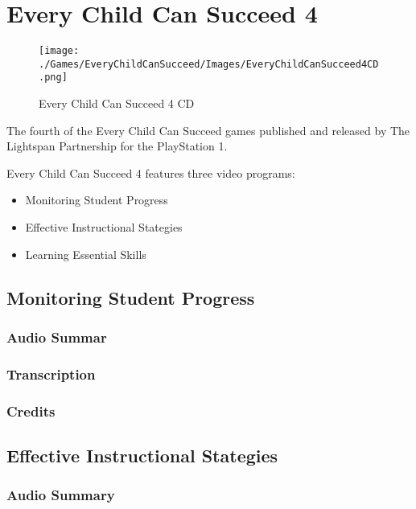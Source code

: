 \chapter{Every Child Can Succeed 4}

\begin{figure}[H]
    \centering
    \texttt{[image: ./Games/EveryChildCanSucceed/Images/EveryChildCanSucceed4CD.png]}
    \caption{Every Child Can Succeed 4 CD}
\end{figure}


The fourth of the Every Child Can Succeed games published and released by The Lightspan Partnership for the PlayStation 1.

Every Child Can Succeed 4 features three video programs:

\begin{itemize}
    \item Monitoring Student Progress
    \item Effective Instructional Stategies
    \item Learning Essential Skills
\end{itemize}

\clearpage
\newpage

\section{Monitoring Student Progress}

\subsection{Audio Summar}

\subsection{Transcription}

\subsection{Credits}

\section{Effective Instructional Stategies}

\subsection{Audio Summary}

